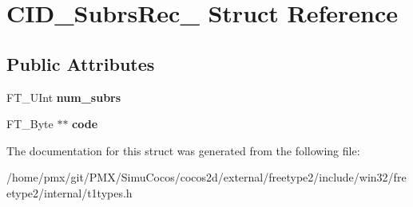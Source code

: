 \hypertarget{structCID__SubrsRec__}{}\section{C\+I\+D\+\_\+\+Subrs\+Rec\+\_\+ Struct Reference}
\label{structCID__SubrsRec__}
\subsection*{Public Attributes}
\begin{DoxyCompactItemize}
\item 
\mbox{\label{structCID__SubrsRec___a3abd23388e2e0f4888f826a993953c7e}} 
F\+T\+\_\+\+U\+Int {\bfseries num\+\_\+subrs}
\item 
\mbox{\label{structCID__SubrsRec___ad116d41097d4760bc882dabab805ae2b}} 
F\+T\+\_\+\+Byte $\ast$$\ast$ {\bfseries code}
\end{DoxyCompactItemize}


The documentation for this struct was generated from the following file\+:\begin{DoxyCompactItemize}
\item 
/home/pmx/git/\+P\+M\+X/\+Simu\+Cocos/cocos2d/external/freetype2/include/win32/freetype2/internal/t1types.\+h\end{DoxyCompactItemize}

